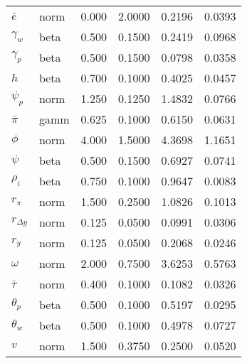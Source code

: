 \begin{center}
\begin{longtable}{llcccc}
${\bar{e}}$ & norm &   0.000 & 2.0000 &   0.2196 &  0.0393 \\ 
${\gamma_w}$ & beta &   0.500 & 0.1500 &   0.2419 &  0.0968 \\ 
${\gamma_p}$ & beta &   0.500 & 0.1500 &   0.0798 &  0.0358 \\ 
${h}$ & beta &   0.700 & 0.1000 &   0.4025 &  0.0457 \\ 
${\psi_p}$ & norm &   1.250 & 0.1250 &   1.4832 &  0.0766 \\ 
${\bar{\pi}}$ & gamm &   0.625 & 0.1000 &   0.6150 &  0.0631 \\ 
${\phi}$ & norm &   4.000 & 1.5000 &   4.3698 &  1.1651 \\ 
${\psi}$ & beta &   0.500 & 0.1500 &   0.6927 &  0.0741 \\ 
${\rho_{i}}$ & beta &   0.750 & 0.1000 &   0.9647 &  0.0083 \\ 
${r_{\pi}}$ & norm &   1.500 & 0.2500 &   1.0826 &  0.1013 \\ 
${r_{\Delta y}}$ & norm &   0.125 & 0.0500 &   0.0991 &  0.0306 \\ 
${r_{y}}$ & norm &   0.125 & 0.0500 &   0.2068 &  0.0246 \\ 
${\omega}$ & norm &   2.000 & 0.7500 &   3.6253 &  0.5763 \\ 
${\bar{\tau}}$ & norm &   0.400 & 0.1000 &   0.1082 &  0.0326 \\ 
${\theta_p}$ & beta &   0.500 & 0.1000 &   0.5197 &  0.0295 \\ 
${\theta_w}$ & beta &   0.500 & 0.1000 &   0.4978 &  0.0727 \\ 
${v}$ & norm &   1.500 & 0.3750 &   0.2500 &  0.0520 \\ 
\end{longtable}
 \end{center}
